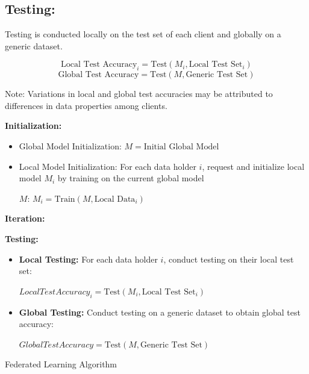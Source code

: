 \documentclass[conference]{IEEEtran}
\begin{document}
\subsection{Testing:}

Testing is conducted locally on the test set of each client and globally on a generic dataset.

\[ \text{Local Test Accuracy}_i = \text{Test}(M_i, \text{Local Test Set}_i) \]
\[ \text{Global Test Accuracy} = \text{Test}(M, \text{Generic Test Set}) \]

Note: Variations in local and global test accuracies may be attributed to differences in data properties among clients.


\begin{algorithm}[H]
\begin{scriptsize}  
    
    \textbf{Initialization:}
    \begin{itemize}
        \item Global Model Initialization: $M = \text{Initial Global Model}$
        \item Local Model Initialization: For each data holder $i$, request and initialize local model $M_i$ by training on the current global model 
        
        $M$: $M_i = \text{Train}(M, \text{Local Data}_i)$
    \end{itemize}
    
    \textbf{Iteration:}
    
    \textbf{Testing:}
    \begin{itemize}
        \item \textbf{Local Testing:} For each data holder $i$, conduct testing on their local test set:

        $Local Test Accuracy_i = \text{Test}(M_i, \text{Local Test Set}_i)$
        \item \textbf{Global Testing:} Conduct testing on a generic dataset to obtain global test accuracy: 
        
        $Global Test Accuracy = \text{Test}(M, \text{Generic Test Set})$
    \end{itemize}
    
    \caption{Federated Learning Algorithm}
\end{scriptsize}
    
\end{algorithm}
\end{document}
